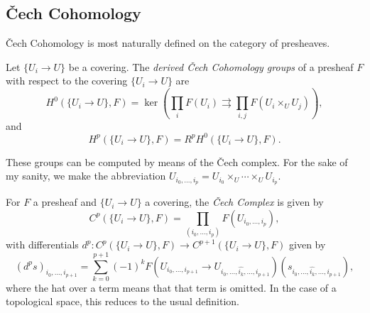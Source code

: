 \subsection{\v{C}ech Cohomology}

\v{C}ech Cohomology is most naturally defined on the category of presheaves.

\begin{defn} Let $\{U_i\rightarrow U\}$ be a covering. The \emph{derived \v{C}ech Cohomology groups} of a presheaf $F$ with respect to the covering $\{U_i\rightarrow U\}$ are
\[
H^0(\{U_i\rightarrow U\},F) = \ker(\prod_i F(U_i) \rightrightarrows \prod_{i,j} F(U_i \times_U U_j)),
\]
and
\[
H^p(\{U_i\rightarrow U\},F) = R^pH^0(\{U_i\rightarrow U\},F).
\]
\end{defn}

These groups can be computed by means of the \v{C}ech complex. For the sake of my sanity, we make the abbreviation $U_{i_0, ..., i_p} = U_{i_0} \times_U \cdots \times_U U_{i_p}$.

\begin{defn} For $F$ a presheaf and $\{U_i\rightarrow U\}$ a covering, the \emph{\v{C}ech Complex} is given by
\[
C^p(\{U_i\rightarrow U\}, F) = \prod_{(i_0, ..., i_p)} F(U_{i_0, ..., i_p}),
\]
with differentials $d^p:C^p(\{U_i\rightarrow U\}, F) \rightarrow C^{p+1}(\{U_i\rightarrow U\}, F)$ given by
\[
(d^ps)_{i_0, ..., i_{p+1}} = \sum_{k=0}^{p+1} (-1)^k F(U_{i_0, ..., i_{p+1}} \rightarrow U_{i_0, ..., \widehat{i_k}, ..., i_{p+1}})(s_{i_0, ..., \widehat{i_k}, ..., i_{p+1}}),
\]
where the hat over a term means that that term is omitted. In the case of a topological space, this reduces to the usual definition.
\end{defn}

